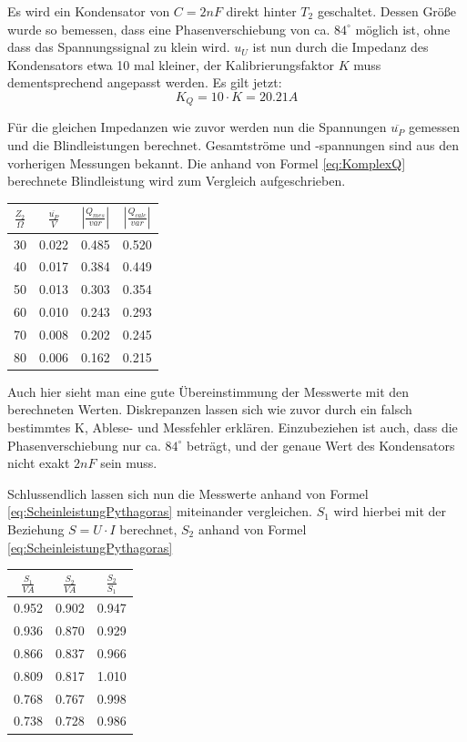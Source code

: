 Es wird ein Kondensator von $C=2nF$ direkt hinter $T_2$ geschaltet. Dessen Größe wurde so bemessen, dass eine Phasenverschiebung von ca. $84^\circ$ möglich ist, ohne dass das Spannungssignal zu klein wird. $u_U$ ist nun durch die Impedanz des Kondensators etwa 10 mal kleiner, der Kalibrierungsfaktor $K$ muss dementsprechend angepasst werden. Es gilt jetzt:
\begin{equation*}
K_{Q} = 10\cdot K = 20.21A
\end{equation*}

Für die gleichen Impedanzen wie zuvor werden nun die Spannungen $\overline{u_P}$ gemessen und die Blindleistungen berechnet. Gesamtströme und -spannungen sind aus den vorherigen Messungen bekannt. Die anhand von Formel \eqref{eq:KomplexQ} berechnete Blindleistung wird zum Vergleich aufgeschrieben.

\begin{large}
\begin{center}
\begin{tabular}{| c | c | c | c |}
\hline
$\frac{Z_2}{\Omega}$ & $\frac{\overline{u_P}}{V}$ & 
$\left|\frac{Q_{mes}}{var}\right|$ & $\left|\frac{Q_{calc}}{var}\right|$ \\
\hline
30 & 0.022 & 0.485 & 0.520 \\
40 & 0.017 & 0.384 & 0.449 \\
50 & 0.013 & 0.303 & 0.354 \\
60 & 0.010 & 0.243 & 0.293 \\
70 & 0.008 & 0.202 & 0.245 \\
80 & 0.006 & 0.162 & 0.215 \\
\hline
\end{tabular}
\end{center}
\end{large}

Auch hier sieht man eine gute Übereinstimmung der Messwerte mit den berechneten Werten. Diskrepanzen lassen sich wie zuvor durch ein falsch bestimmtes K, Ablese- und Messfehler erklären. Einzubeziehen ist auch, dass die Phasenverschiebung nur ca. $84^\circ$ beträgt, und der genaue Wert des Kondensators nicht exakt $2nF$ sein muss.

Schlussendlich lassen sich nun die Messwerte anhand von Formel \eqref{eq:ScheinleistungPythagoras} miteinander vergleichen. $S_1$ wird hierbei mit der Beziehung $S=U\cdot I$ berechnet, $S_2$ anhand von Formel \eqref{eq:ScheinleistungPythagoras}

\begin{large}
\begin{center}
\begin{tabular}{| c | c | c |}
\hline
$\frac{S_1}{VA}$ & $\frac{S_2}{VA}$ & $\frac{S_2}{S_1}$ \\
\hline
0.952 & 0.902 & 0.947 \\
0.936 & 0.870 & 0.929 \\
0.866 & 0.837 & 0.966 \\
0.809 & 0.817 & 1.010 \\
0.768 & 0.767 & 0.998 \\
0.738 & 0.728 & 0.986 \\
\hline
\end{tabular}
\end{center}
\end{large}